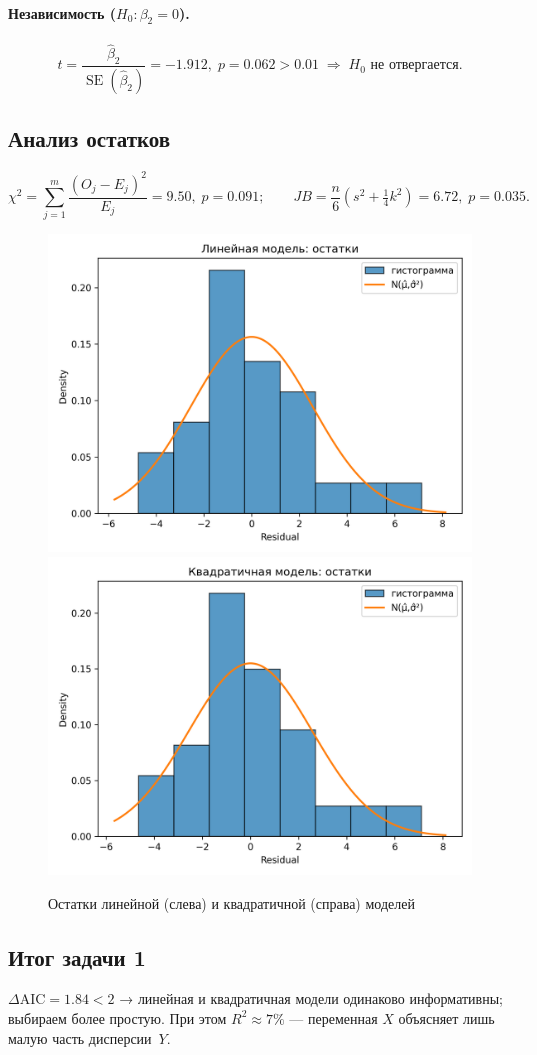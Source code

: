 \documentclass[areasetadvanced]{scrartcl}
\begin{document}
\paragraph{Независимость ($H_0:\beta_2=0$).}
\[
t=\frac{\hat\beta_2}{\operatorname{SE}(\hat\beta_2)}
  =-1.912,\; p=0.062>0.01\;\Rightarrow\;H_0\text{ не отвергается.}
\]

\subsection{Анализ остатков}
\[
\chi^2=\sum_{j=1}^{m}
\frac{(O_j-E_j)^2}{E_j}=9.50,\;
p=0.091;
\qquad
JB=\frac{n}{6}(s^2+\tfrac14k^2)=6.72,\;
p=0.035.
\]

\begin{figure}[H]
  \centering
  \includegraphics[width=.48\textwidth]{figs/task1_resid_hist_lin.png}\hfill
  \includegraphics[width=.48\textwidth]{figs/task1_resid_hist_poly.png}
  \caption{Остатки линейной (слева) и квадратичной (справа) моделей}
\end{figure}

\subsection{Итог задачи 1}
$\Delta\text{AIC}=1.84<2$ → линейная и квадратичная модели одинаково
информативны; выбираем более простую.  
При этом $R^2\!\approx\!7\%$ — переменная $X$ объясняет лишь малую часть
дисперсии~$Y$.
\end{document}

